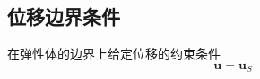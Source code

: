 \documentclass[12pt,a4paper]{article}
\begin{document}
\subsection{位移边界条件}
在弹性体的边界上给定位移的约束条件
$$
\textbf{u}=\textbf{u}_S
$$









































%

%
\end{document}
